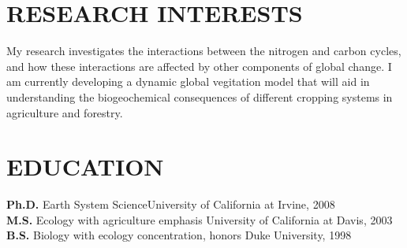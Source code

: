 \documentclass[line,10pt]{res}
\begin{document}

\begin{resume}


\section{RESEARCH INTERESTS}
My research investigates the interactions between the nitrogen and carbon cycles, and how these interactions are affected by other components of global change. I am currently developing a dynamic global vegitation model that will aid in understanding the biogeochemical consequences of different cropping systems in agriculture and forestry.

\section{EDUCATION}

 \textbf{Ph.D.} Earth System Science\hfill University of California at Irvine, 2008 \\
 \textbf{M.S.} Ecology with agriculture emphasis \hfill University of California at Davis, 2003   \\ 
 \textbf{B.S.} Biology with ecology concentration, honors \hfill Duke University, 1998 


\end{resume}
\end{document}

